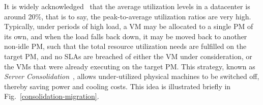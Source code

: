 It is widely acknowledged~\cite{capacity-planning, emerging-research-directions}
that the average utilization
levels in a datacenter is around 20\%, that is to say,
the peak-to-average utilization ratios are very high. Typically,
under periods of high load, a VM may be allocated to a single PM of its
own, and when the load falls back down, it may be moved back to another
non-idle PM, such that the total resource utilization needs are
fulfilled on the target PM, and no SLAs are 
breached of either the VM under
consideration, or the VMs 
that were already executing on the target PM. This
strategy, known as \textit{Server Consolidation}~\cite{grouping-ga, 
two-stage-heuristic, performance-eval, 
LQR-varsha},
allows under-utilized physical machines 
to be switched off,
thereby saving power and cooling costs. 
This idea is illustrated briefly in Fig.~\ref{consolidation-migration}.


